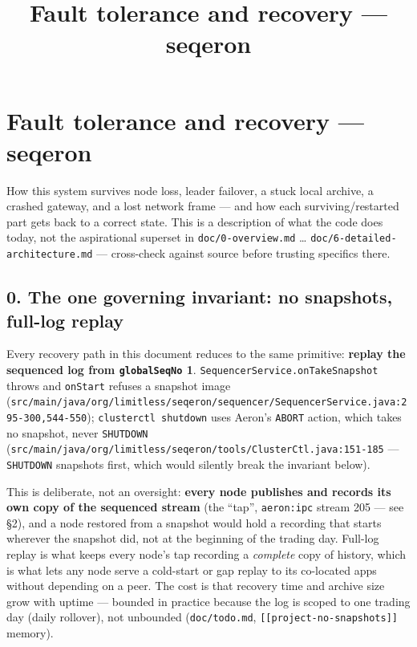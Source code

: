 \documentclass[
  10pt,
]{article}
\title{Fault tolerance and recovery --- seqeron}
\author{}
\date{}
\begin{document}
\maketitle

{
\setcounter{tocdepth}{3}
\tableofcontents
}
\section{Fault tolerance and recovery ---
seqeron}\label{fault-tolerance-and-recovery-seqeron}

How this system survives node loss, leader failover, a stuck local
archive, a crashed gateway, and a lost network frame --- and how each
surviving/restarted part gets back to a correct state. This is a
description of what the code does today, not the aspirational superset
in \texttt{doc/0-overview.md} \ldots{}
\texttt{doc/6-detailed-architecture.md} --- cross-check against source
before trusting specifics there.

\subsection{0. The one governing invariant: no snapshots, full-log
replay}\label{the-one-governing-invariant-no-snapshots-full-log-replay}

Every recovery path in this document reduces to the same primitive:
\textbf{replay the sequenced log from \texttt{globalSeqNo} 1}.
\texttt{SequencerService.onTakeSnapshot} throws and \texttt{onStart}
refuses a snapshot image
(\texttt{src/main/java/org/limitless/seqeron/sequencer/SequencerService.java:295-300,544-550});
\texttt{clusterctl\ shutdown} uses Aeron's \texttt{ABORT} action, which
takes no snapshot, never \texttt{SHUTDOWN}
(\texttt{src/main/java/org/limitless/seqeron/tools/ClusterCtl.java:151-185}
--- \texttt{SHUTDOWN} snapshots first, which would silently break the
invariant below).

This is deliberate, not an oversight: \textbf{every node publishes and
records its own copy of the sequenced stream} (the ``tap'',
\texttt{aeron:ipc} stream 205 --- see §2), and a node restored from a
snapshot would hold a recording that starts wherever the snapshot did,
not at the beginning of the trading day. Full-log replay is what keeps
every node's tap recording a \emph{complete} copy of history, which is
what lets any node serve a cold-start or gap replay to its co-located
apps without depending on a peer. The cost is that recovery time and
archive size grow with uptime --- bounded in practice because the log is
scoped to one trading day (daily rollover), not unbounded
(\texttt{doc/todo.md}, \texttt{{[}{[}project-no-snapshots{]}{]}}
memory).
\end{document}
